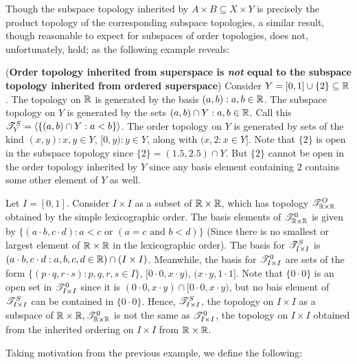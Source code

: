 \documentclass[main.tex]{subfiles}
\begin{document}
Though the subspace topology inherited by $A \times B \subseteq X \times Y$ is precisely the product topology of the corresponding subspace topologies, a similar result, though reasonable to expect for subspaces of order topologies, does not, unfortunately, hold; as the following example reveals:
\begin{example} (\textbf{Order topology inherited from superspace is \emph{not} equal to the subspace topology inherited from ordered superspace})
    Consider $Y=[0,1] \cup \{2\} \subseteq \mathbb R$. The topology on $\mathbb R$ is generated by the basis $(a,b):a,b \in \mathbb R$. The subspace topology on $Y$ is generated by the sets $(a,b) \cap Y: a,b \in \mathbb R$. Call this $\mathscr T^S_Y=\langle \{(a,b)\cap Y: a<b\}\rangle$.  The order topology on $Y$ is generated by sets of the kind $(x,y): x,y \in Y$, $[0,y): y \in Y$, along with $(x,2: x \in Y]$. Note that $\{2\}$ is open in the subspace topology since $\{2\}=(1.5,2.5) \cap Y$. But $\{2\}$ cannot be open in the order topology inherited by $Y$ since any basis element containing $2$ contains some other element of $Y$ as well. \end{example}

    \begin{example}
        Let $I=[0,1]$. Consider $I \times I$ as a subset of $\mathbb R\times \mathbb R$, which has topology $\mathscr T^O_{\mathbb R \times \mathbb R}$ obtained by the simple lexicographic order. The basis elements of $\mathscr T^0_{\mathbb R \times \mathbb R}$ is given by $\{(a\cdot b, c \cdot d): a<c \text{ or } (a=c \text{ and }b<d )\}$ (Since there is no smallest or largest element of $\mathbb R \times \mathbb R$ in the lexicographic order). The basis for $\mathscr T^S_{I \times I}$ is $(a\cdot b, c\cdot d: a,b,c,d \in \mathbb R ) \cap (I \times I)$. Meanwhile, the basis for $\mathscr T^0_{I \times I}$ are sets of the form $\{(p\cdot q, r\cdot s):p,q,r,s \in I\}$, $[0\cdot 0, x \cdot y)$, $(x\cdot y, 1\cdot 1]$. Note that $\{0 \cdot 0\}$ is an open set in $\mathscr T^0_{I \times I}$ since it is $(0\cdot0, x \cdot y) \cap [0\cdot 0, x \cdot y)$, but no bais element of $\mathscr T^S_{I \times I}$ can be contained in $\{0 \cdot 0 \}$. Hence, $\mathscr T^S_{I \times I}$, the topology on $I \times I$ as a subspace of $\mathbb R\times\mathbb R, \mathscr T^0_{\mathbb R \times \mathbb R}$ is not the same as $\mathscr T^0_{I \times I}$, the topology on $I \times I$ obtained from the inherited ordering on $I \times I$ from $\mathbb R\times\mathbb R$.
\end{example}
Taking motivation from the previous example, we define the following:
\end{document}
